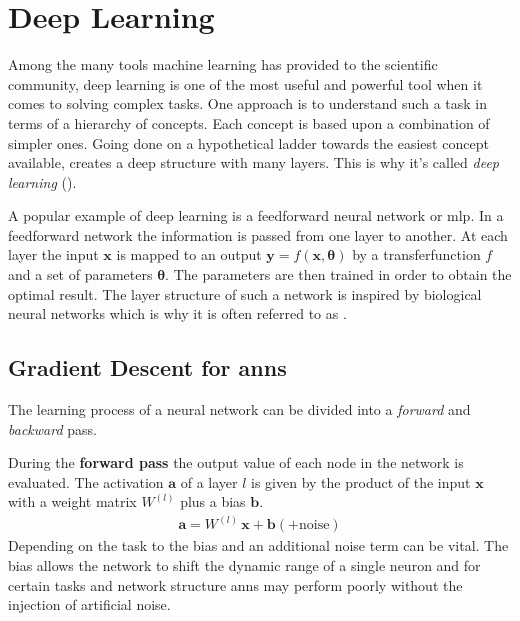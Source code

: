 \section{Deep Learning}
\label{deeplearning}
Among the many tools machine learning has provided to the scientific community, deep learning is one of the most useful and powerful tool when it comes to solving complex tasks. One approach is to understand such a task in terms of a hierarchy of concepts. Each concept is based upon a combination of simpler ones. Going done on a hypothetical ladder towards the easiest concept available, creates a deep structure with many layers. This is why it's called \textit{deep learning} (\cite{Goodfellow-et-al-2016}).

A popular example of deep learning is a feedforward neural network or \gls{mlp}. In a feedforward network the information is passed from one layer to another. At each layer the input $\mathbf{x}$ is mapped to an output $\mathbf{y} = f(\mathbf{x, \theta})$ by a transferfunction $f$ and a set of parameters $\mathbf{\theta}$. The parameters are then trained in order to obtain the optimal result. The layer structure of such a network is inspired by biological neural networks which is why it is often referred to as .\\



\subsection{Gradient Descent for \glspl{ann}}
\label{trainingANN}
The learning process of a neural network can be divided into a \emph{forward} and \emph{backward} pass. 

During the \textbf{forward pass} the output value of each node in the network is evaluated. The activation $\mathbf{a}$ of a layer $l$ is given by the product of the input $\mathbf{x}$ with a weight matrix $W^{(l)}$ plus a bias $\mathbf{b}$.
\begin{align}
\label{activation}
\mathbf{a} = W^{(l)} \, \mathbf{x} + \mathbf{b} \left(+ \text{noise}\right)
\end{align}
Depending on the task to the bias and an additional noise term can be vital. The bias allows the network to shift the dynamic range of a single neuron and for certain tasks and network structure \glspl{ann} may perform poorly without the injection of artificial noise.

